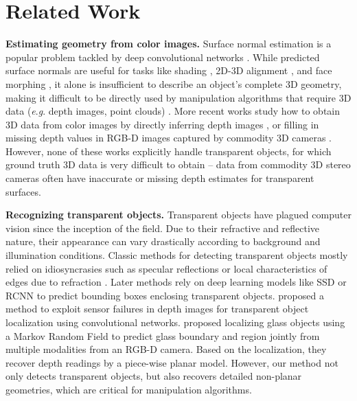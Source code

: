 \documentclass[letterpaper, 10 pt, conference]{ieeeconf}
\newcommand{\myparagraph}[1]{\vspace{0.03in}\noindent\textbf{#1}}
\newcommand{\eg}{\textit{e}.\textit{g}. }
\begin{document}
\section{Related Work}

\myparagraph{Estimating geometry from color images.} Surface normal estimation is a popular problem tackled by deep convolutional networks \cite{wang2015surface, eigen2015predicting, zhang2016physically, Zeng_2019_CVPR}. While predicted surface normals are useful for tasks 
like shading \cite{Hudon_2018_ECCV_Workshops}, 2D-3D alignment \cite{bansal2016marr}, and face morphing \cite{kokkinosface}, it alone is insufficient to describe an object's complete 3D geometry, making it difficult to be directly used by manipulation algorithms that require 3D data (\eg depth images, point clouds) \cite{ten2018using,zeng2018robotic,mahler2017dex}. More recent works study how to obtain 3D data from color images by directly inferring depth images \cite{corr2014EigenPF,corr2016LainaRBTN,corr2016ChenFYD,ramamonjisoa2019sharpnet,hu2019revisiting,icra2019fastdepth,fu2018deep}, or filling in missing depth values in RGB-D images captured by commodity 3D cameras \cite{herrera2013depth, gong2013guided,zhang2018deepdepth}. 
However, none of these works explicitly handle transparent objects, for which ground truth 3D data is very difficult to obtain -- data from commodity 3D stereo cameras often have inaccurate or missing depth estimates for transparent surfaces.

\myparagraph{Recognizing transparent objects.}
Transparent objects have plagued computer vision since the inception of the field. Due to their refractive and reflective nature, their appearance can vary drastically according to background and illumination conditions. Classic methods for detecting transparent objects mostly relied on idiosyncrasies such as specular reflections or local characteristics of edges due to refraction \cite{phillips2011novel, fritz2009additive, mchenry2006geodesic, McHenry_2005_findingglass}. Later methods rely on deep learning models like SSD \cite{khaing2018transparent} or RCNN \cite{lai2015transparent} to predict bounding boxes enclosing transparent objects. \citet{seib2017friend} proposed a method to exploit sensor failures in depth images for transparent object localization using convolutional networks. \citet{wang2012glass} proposed localizing glass objects using a Markov Random Field to predict glass boundary and region jointly from multiple modalities from an RGB-D camera. Based on the localization, they recover depth readings by a piece-wise planar model. However, our method not only detects transparent objects, but also recovers detailed non-planar geometries, which are critical for manipulation algorithms.
\end{document}
